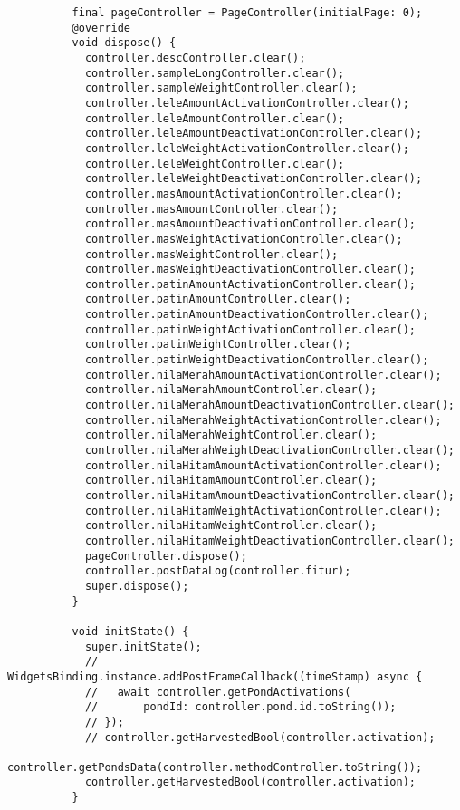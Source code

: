 \begin{lstlisting}
          final pageController = PageController(initialPage: 0);
          @override
          void dispose() {
            controller.descController.clear();
            controller.sampleLongController.clear();
            controller.sampleWeightController.clear();
            controller.leleAmountActivationController.clear();
            controller.leleAmountController.clear();
            controller.leleAmountDeactivationController.clear();
            controller.leleWeightActivationController.clear();
            controller.leleWeightController.clear();
            controller.leleWeightDeactivationController.clear();
            controller.masAmountActivationController.clear();
            controller.masAmountController.clear();
            controller.masAmountDeactivationController.clear();
            controller.masWeightActivationController.clear();
            controller.masWeightController.clear();
            controller.masWeightDeactivationController.clear();
            controller.patinAmountActivationController.clear();
            controller.patinAmountController.clear();
            controller.patinAmountDeactivationController.clear();
            controller.patinWeightActivationController.clear();
            controller.patinWeightController.clear();
            controller.patinWeightDeactivationController.clear();
            controller.nilaMerahAmountActivationController.clear();
            controller.nilaMerahAmountController.clear();
            controller.nilaMerahAmountDeactivationController.clear();
            controller.nilaMerahWeightActivationController.clear();
            controller.nilaMerahWeightController.clear();
            controller.nilaMerahWeightDeactivationController.clear();
            controller.nilaHitamAmountActivationController.clear();
            controller.nilaHitamAmountController.clear();
            controller.nilaHitamAmountDeactivationController.clear();
            controller.nilaHitamWeightActivationController.clear();
            controller.nilaHitamWeightController.clear();
            controller.nilaHitamWeightDeactivationController.clear();
            pageController.dispose();
            controller.postDataLog(controller.fitur);
            super.dispose();
          }
        
          void initState() {
            super.initState();
            // WidgetsBinding.instance.addPostFrameCallback((timeStamp) async {
            //   await controller.getPondActivations(
            //       pondId: controller.pond.id.toString());
            // });
            // controller.getHarvestedBool(controller.activation);
            controller.getPondsData(controller.methodController.toString());
            controller.getHarvestedBool(controller.activation);
          }
        

\end{lstlisting}
